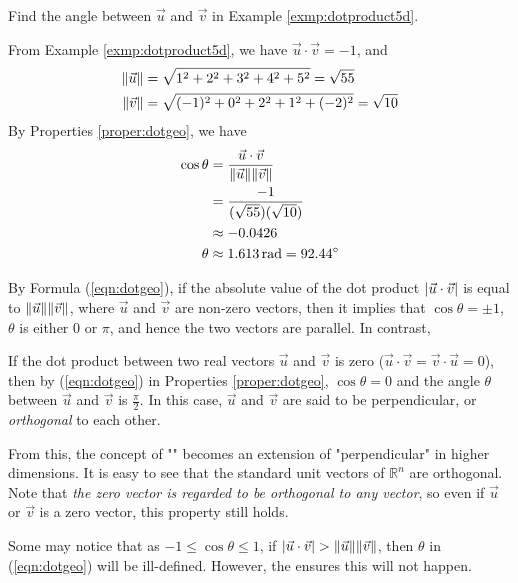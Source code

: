 \begin{exmp}
Find the angle between $\vec{u}$ and $\vec{v}$ in Example \ref{exmp:dotproduct5d}.
\end{exmp}
\begin{solution}
From Example \ref{exmp:dotproduct5d}, we have $\vec{u} \cdot \vec{v} = -1$, and
\begin{align*}
\norm{\vec{u}} &= \sqrt{1^2 + 2^2 + 3^2 + 4^2 + 5^2} = \sqrt{55} \\
\norm{\vec{v}} &= \sqrt{(-1)^2 + 0^2 + 2^2 + 1^2 + (-2)^2} = \sqrt{10} 
\end{align*}
By Properties \ref{proper:dotgeo}, we have
\begin{align*}
\cos\theta &= \frac{\vec{u} \cdot \vec{v}}{\norm{\vec{u}}\norm{\vec{v}}} \\
&= \frac{-1}{(\sqrt{55})(\sqrt{10})} \\
&\approx -0.0426 \\
\theta &\approx \SI{1.613}{\radian} = \SI{92.44}{\degree}
\end{align*}
\end{solution}
By Formula (\ref{eqn:dotgeo}), if the absolute value of the dot product $\abs{\vec{u} \cdot \vec{v}}$ is equal to $\norm{\vec{u}}\norm{\vec{v}}$, where $\vec{u}$ and $\vec{v}$ are non-zero vectors, then it implies that $\cos\theta = \pm 1$, $\theta$ is either $0$ or $\pi$, and hence the two vectors are parallel. In contrast,
\begin{proper}
\label{proper:dotorth}
If the dot product between two real vectors $\vec{u}$ and $\vec{v}$ is zero ($\vec{u} \cdot \vec{v} = \vec{v} \cdot \vec{u} = 0$), then by (\ref{eqn:dotgeo}) in Properties \ref{proper:dotgeo}, $\cos\theta = 0$ and the angle $\theta$ between $\vec{u}$ and $\vec{v}$ is $\frac{\pi}{2}$. In this case, $\vec{u}$ and $\vec{v}$ are said to be perpendicular, or \textit{orthogonal} to each other.
\end{proper}
From this, the concept of "" becomes an extension of "perpendicular" in higher dimensions. It is easy to see that the standard unit vectors of $\mathbb{R}^n$ are orthogonal. Note that \textit{the zero vector is regarded to be orthogonal to any vector}, so even if $\vec{u}$ or $\vec{v}$ is a zero vector, this property still holds. \par
Some may notice that as $-1 \leq \cos\theta \leq 1$, if $\abs{\vec{u} \cdot \vec{v}} > \norm{\vec{u}}\norm{\vec{v}}$, then $\theta$ in (\ref{eqn:dotgeo}) will be ill-defined. However, the  ensures this will not happen.
